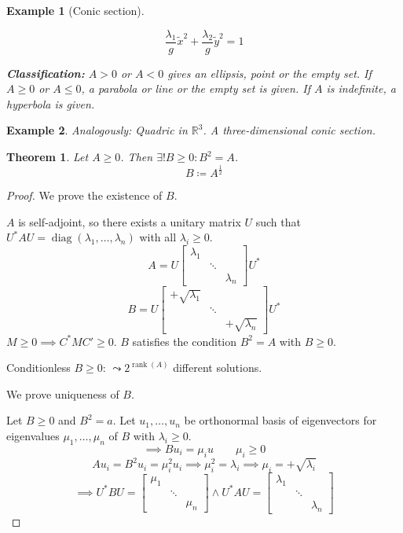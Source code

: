 \documentclass{article}
\newtheorem{theorem}{Theorem}  \numberwithin{theorem}{section}
\newtheorem{example}{Example}  \numberwithin{example}{section}
\DeclareMathOperator{\rank}{rank}
\begin{document}
\begin{example}[Conic section]
\begin{description}
\begin{description}
          \[ \frac{\lambda_1}{g} \tilde x^2 + \frac{\lambda_2}{g} \tilde y^2 = 1 \]

      \end{description}
  \end{description}

  \textbf{Classification:}
  $A > 0$ or $A < 0$ gives an ellipsis, point or the empty set.
  If $A \geq 0$ or $A \leq 0$, a parabola or line or the empty set is given.
  If $A$ is indefinite, a hyperbola is given.
\end{example}

\begin{example} %
  Analogously: Quadric in $\mathbb R^3$.
  A three-dimensional conic section.
\end{example}

\begin{theorem}
   Let $A \geq 0$. Then $\exists! B \geq 0: B^2 = A$.
   \[ B \coloneqq A^{\frac12} \]
\end{theorem}

\begin{proof}
  We prove the existence of $B$.

  $A$ is self-adjoint, so there exists a unitary matrix $U$ such that $U^* AU = \operatorname{diag}(\lambda_1, \dots, \lambda_n)$
  with all $\lambda_i \geq 0$.
  \[ A = U \begin{bmatrix} \lambda_1 & & \\ & \ddots & \\ & & \lambda_n \end{bmatrix} U^* \]
  \[ B = U \begin{bmatrix} +\sqrt{\lambda_1} & & \\ & \ddots & \\ & & +\sqrt{\lambda_n} \end{bmatrix} U^* \]
  $M \geq 0 \implies C^* MC' \geq 0$.
  $B$ satisfies the condition $B^2 = A$ with $B \geq 0$.

  Conditionless $B \geq 0$: $\leadsto 2^{\rank(A)}$ different solutions.

  We prove uniqueness of $B$.

  Let $B \geq 0$ and $B^2 = a$.
  Let $u_1, \dots, u_n$ be orthonormal basis of eigenvectors for eigenvalues $\mu_1, \dots, \mu_n$ of $B$ with $\lambda_i \geq 0$.
  \[ \implies Bu_i = \mu_i u \qquad \mu_i \geq 0 \]
  \[ Au_i = B^2 u_i = \mu_i^2 u_i \implies \mu_i^2 = \lambda_i \implies \mu_i = +\sqrt{\lambda_i} \]
  \[
    \implies U^* BU = \begin{bmatrix} \mu_1 & & \\ & \ddots & \\ & & \mu_n \end{bmatrix}
    \land    U^* AU = \begin{bmatrix} \lambda_1 & & \\ & \ddots & \\ & & \lambda_n \end{bmatrix}
  \]
\end{proof}
\end{document}
